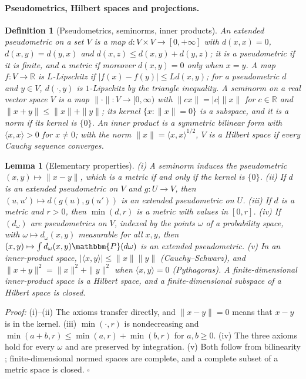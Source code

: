 \documentclass{article}
\newcommand{\RR}{\mathbb{R}}
\newcommand{\PP}{\mathbbm{P}}
\theoremstyle{plain}
\newtheorem{lemma}[theorem]{Lemma}
\newtheorem{definition}[theorem]{Definition}
\theoremstyle{remark}
\begin{document}
\paragraph{Pseudometrics, Hilbert spaces and projections.}

\begin{definition}[Pseudometrics, seminorms, inner products]\label{def:metric_spaces}
An \emph{extended pseudometric} on a set $V$ is a map $d:V\times V\to[0,+\infty]$ with $d(x,x)=0$, $d(x,y)=d(y,x)$ and $d(x,z)\le d(x,y)+d(y,z)$;
it is a \emph{pseudometric} if it is finite, and a \emph{metric} if moreover $d(x,y)=0$ only when $x=y$. A map $f:V\to\RR$ is
\emph{$L$-Lipschitz} if $|f(x)-f(y)|\le Ld(x,y)$; for a pseudometric $d$ and $y\in V$, $d(\cdot,y)$ is $1$-Lipschitz by the triangle inequality.
A \emph{seminorm} on a real vector space $V$ is a map $\|\cdot\|:V\to[0,\infty)$ with $\|cx\|=|c|\|x\|$ for $c\in\RR$ and $\|x+y\|\le\|x\|+\|y\|$; its
\emph{kernel} $\{x:\|x\|=0\}$ is a subspace, and it is a \emph{norm} if its kernel is $\{0\}$. An \emph{inner product} is a symmetric bilinear
form with $\langle x,x\rangle>0$ for $x\ne0$; with the norm $\|x\|=\langle x,x\rangle^{1/2}$, $V$ is a \emph{Hilbert space} if every Cauchy sequence
converges.
\end{definition}

\begin{lemma}[Elementary properties]\label{lem:constructions}
(i) A seminorm induces the pseudometric $(x,y)\mapsto\|x-y\|$, which is a metric if and only if the kernel is $\{0\}$.
(ii) If $d$ is an extended pseudometric on $V$ and $g:U\to V$, then $(u,u')\mapsto d(g(u),g(u'))$ is an extended pseudometric on $U$.
(iii) If $d$ is a metric and $r>0$, then $\min(d,r)$ is a metric with values in $[0,r]$.
(iv) If $(d_\omega)$ are pseudometrics on $V$, indexed by the points $\omega$ of a probability space, with $\omega\mapsto d_\omega(x,y)$ measurable for all
$x,y$, then $(x,y)\mapsto\int d_\omega(x,y)\PP(d\omega)$ is an extended pseudometric.
(v) In an inner-product space, $|\langle x,y\rangle|\le\|x\|\|y\|$ (Cauchy--Schwarz), and $\|x+y\|^2=\|x\|^2+\|y\|^2$ when $\langle x,y\rangle=0$
(Pythagoras). A finite-dimensional inner-product space is a Hilbert space, and a finite-dimensional subspace of a Hilbert space is
closed.
\end{lemma}
\textit{Proof:}
(i)--(ii) The axioms transfer directly, and $\|x-y\|=0$ means that $x-y$ is in the kernel. (iii) $\min(\cdot,r)$ is nondecreasing and
$\min(a+b,r)\le\min(a,r)+\min(b,r)$ for $a,b\ge0$. (iv) The three axioms hold for every $\omega$ and are preserved by integration. (v) Both
follow from bilinearity \citep[Sec.~5.1]{brezis2011functional}; finite-dimensional normed spaces are complete, and a complete
subset of a metric space is closed. \hfill$\square$
\end{document}
